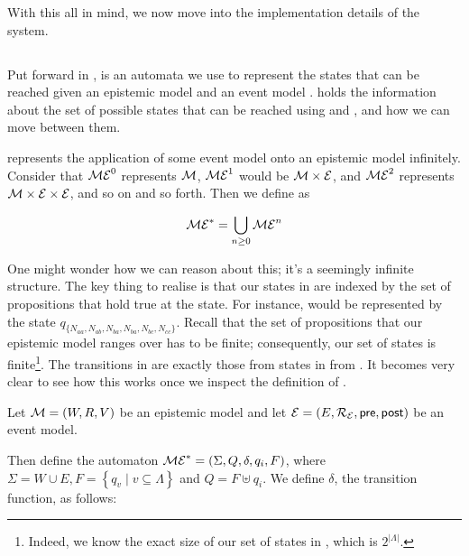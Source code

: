 \documentclass[12pt, a4paper]{article}
\begin{document}
\bigskip \bigskip \bigskip

With this all in mind, we now move into the implementation details of the
system. 

\subsection{\mestar}
\label{subsec:mestar}

Put forward in \cite{AutomataTechniques}, \mestar is an automata we use to
represent the states that can be reached given an epistemic model  and an
event model . \mestar holds the information about the set of possible
states that can be reached using  and , and how we can move
between them.

\bigskip

\mestar represents the application of some event model  onto an epistemic
model  infinitely. Consider that $\mathcal{ME}^0$ represents $\mathcal{M}$,
$\mathcal{ME}^1$ would be $\mathcal{M} \times \mathcal{E}$, and $\mathcal{ME}^2$ represents $\mathcal{M}
\times \mathcal{E} \times \mathcal{E}$, and so on and so forth. Then we define \mestar as

\begin{equation*}
  \mathcal{ME}^\ast = \bigcup_{n \geq 0} \mathcal{ME}^n
\end{equation*}

One might wonder how we can reason about this; it's a seemingly infinite
structure. The key thing to realise is that our states in \mestar are indexed by
the set of propositions that hold true at the state. For instance,
 would be represented by the state $q_{\{N_{aa},
  N_{ab}, N_{ba}, N_{ba}, N_{bc}, N_{cc}\}}$. Recall that the set of propositions that
our epistemic model ranges over has to be finite; consequently, our set of
states is finite\footnote{Indeed, we know the exact size of our set of states in
\mestar, which is $2^{|\Lambda|}$.}. The transitions in \mestar are exactly
those from states in  from . It becomes very clear to see how this
works once we inspect the definition of \mestar. 

\bigskip 

Let $\mathcal{M} = (W, R, V)$ be an epistemic model and let $\mathcal{E} = (E, \mathcal{R_E}, \textsf{pre},
\textsf{post})$ be an event model. 

Then define the automaton $\mathcal{ME}^\ast= (\Sigma, Q, \delta, q_i, F)$, where
$\Sigma = W \cup E, F = \left\{ q_v \mid v \subseteq \Lambda \right\}$ and $Q =
F \uplus {q_i}$. We define $\delta$, the transition function, as follows:
\end{document}
